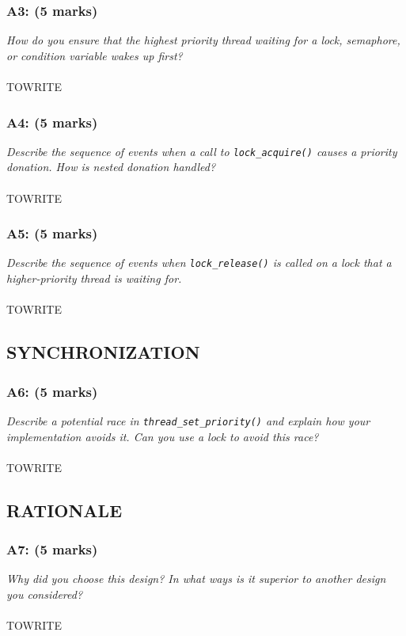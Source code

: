 \documentclass{article}
\begin{document}
\subsubsection*{A3: (5 marks) }
\textit{How do you ensure that the highest priority thread waiting for a lock, semaphore, or condition variable wakes up first?}
\\ \\
TOWRITE

\subsubsection*{A4: (5 marks) }
\textit{Describe the sequence of events when a call to \texttt{lock\_acquire()} causes a priority donation.  How is nested donation handled?}
\\ \\
TOWRITE

\subsubsection*{A5: (5 marks) }
\textit{Describe the sequence of events when \texttt{lock\_release()} is called on a lock that a higher-priority thread is waiting for.}
\\ \\
TOWRITE

\subsection{SYNCHRONIZATION}

\subsubsection*{A6: (5 marks) }
\textit{Describe a potential race in \texttt{thread\_set\_priority()} and explain how your implementation avoids it.  Can you use a lock to avoid this race?}
\\ \\
TOWRITE


\subsection{RATIONALE}

\subsubsection*{A7: (5 marks) }
\textit{Why did you choose this design?  In what ways is it superior to another design you considered?}
\\ \\
TOWRITE
\end{document}
